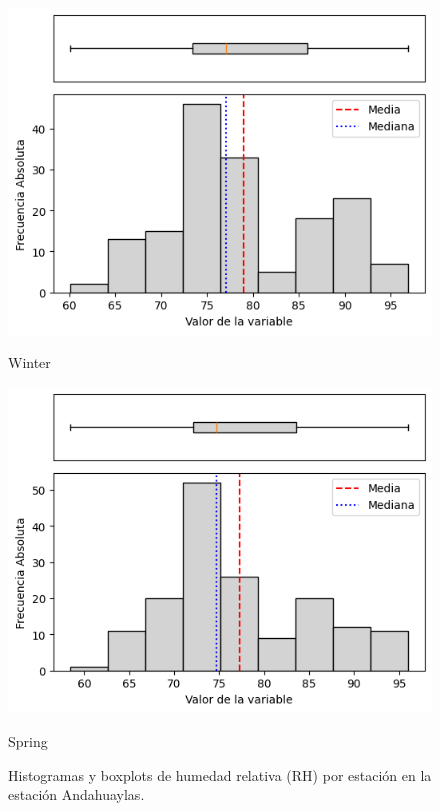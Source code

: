 \begin{figure}[H]
\begin{minipage}{0.30\textwidth}
  \includegraphics[width=\linewidth]{resultados/por_estacion_del_anio/boxplot_clases_por_estacion/Andahuaylas/RH_HistBoxplot_Winter.png}
  \caption*{Winter}
\end{minipage}
\hfill
\begin{minipage}{0.30\textwidth}
  \includegraphics[width=\linewidth]{resultados/por_estacion_del_anio/boxplot_clases_por_estacion/Andahuaylas/RH_HistBoxplot_Spring.png}
  \caption*{Spring}
\end{minipage}
\caption{Histogramas y boxplots de humedad relativa (RH) por estación en la estación Andahuaylas.}
\label{fig:andahuaylas_rh_hist}
\end{figure}

